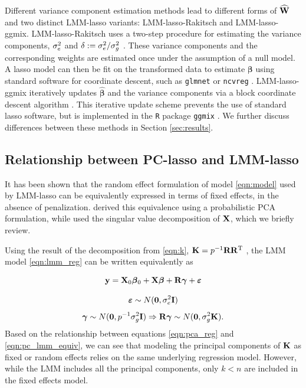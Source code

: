 Different variance component estimation methods lead to different forms of $\widehat{\mathbf{W}}$ and two distinct LMM-lasso variants: LMM-lasso-Rakitsch and LMM-lasso-ggmix. LMM-lasso-Rakitsch uses a two-step procedure for estimating the variance components, $\sigma^2_e$ and $\delta := \sigma^2_e / \sigma^2_g$ \citep{Rakitsch2012}. These variance components and the corresponding weights are estimated once under the assumption of a null model. A lasso model can then be fit on the transformed data to estimate $\boldsymbol{\beta}$ using standard software for coordinate descent, such as \texttt{glmnet} \citep{glmnet} or \texttt{ncvreg} \citep{ncvreg}. LMM-lasso-ggmix iteratively updates $\widehat{\boldsymbol{\beta}}$ and the variance components via a block coordinate descent algorithm \citep{bhatnagar2019simultaneous}. This iterative update scheme prevents the use of standard lasso software, but is implemented in the \texttt{R} package \texttt{ggmix} \citep{ggmix}. We further discuss differences between these methods in Section \ref{sec:results}.



\subsection{Relationship between PC-lasso and LMM-lasso}

It has been shown that the random effect formulation of model \eqref{eqn:model} used by LMM-lasso can be equivalently expressed in terms of fixed effects, in the absence of penalization. \citet{zhang2015principal} derived this equivalence using a probabilistic PCA formulation, while \citet{hoffman2013correcting} used the singular value decomposition of $\mathbf{X}$, which we briefly review.

Using the result of the decomposition from \eqref{eqn:k}, $\mathbf{K} = p^{-1} \mathbf{R} \mathbf{R}^{\text{T}}$ , the LMM model \eqref{eqn:lmm_reg} can be written equivalently as

\begin{equation}
    \label{eqn:pc_lmm_equiv}
    \mathbf{y} = \mathbf{X}_0 \boldsymbol{\beta}{}_0 + \mathbf{X} \boldsymbol{\beta}{} + \mathbf{R} \boldsymbol{\gamma} + \boldsymbol{\varepsilon}{}
\end{equation}

$$ \boldsymbol{\varepsilon}{} \sim N(\boldsymbol{0}, \sigma^2_e \mathbf{I}) $$
$$ \boldsymbol{\gamma} \sim N(\boldsymbol{0}, p^{-1} \sigma^2_g \mathbf{I}) \Rightarrow \mathbf{R} \boldsymbol{\gamma} \sim N(\boldsymbol{0}, \sigma^2_g \mathbf{K}).$$
Based on the relationship between equations \eqref{eqn:pca_reg} and \eqref{eqn:pc_lmm_equiv}, we can see that modeling the principal components of $\mathbf{K}$ as fixed or random effects relies on the same underlying regression model. However, while the LMM includes all the principal components, only $k < n$ are included in the fixed effects model. 


